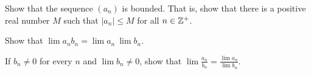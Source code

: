\item Show that the sequence $(a_n)$ is bounded. That is, show that there is a positive real number $M$ such that $|a_n| \leq M$ for all $n \in \mathbb{Z}^+$. 

\item Show that $\lim a_nb_n = \lim a_n \ \lim b_n$. 

\item If $b_n \neq 0$ for every $n$ and $\lim b_n \neq 0$, show that $\lim \frac{a_n}{b_n} = \frac{\lim a_n}{\lim b_n}$. 

\ea

\begin{comment}

\ExerciseSolution

\ba

\item Let $a = \lim a_n$, let $k \in \R$, and let $\epsilon$ be a positive real number. If $k = 0$, then 
\[\lim ka_n = \lim 0 = 0 = 0(a) = 0\lim a_n.\]
So suppose $k \neq 0$. Let $N \in \Z^+$ such that $d(a_n, a) < \frac{\epsilon}{|k|}$ if $n \geq N$. So if $n \geq N$, then 
\[d_E(ka_n, ka) = |k|d_E(a_n,a) < |k| \frac{\epsilon}{|k|} = \epsilon.\]
So $\lim ka_n = ka$. 

\item Let $a = \lim a_n$, $b = \lim b_n$, and let $\epsilon$ be a positive real number. There exists $N_1 \in \Z^+$ such that $d_E(a_n,a) < \frac{\epsilon}{2}$ whenever $n \geq N_1$, and there exists $N_2 \in \Z^+$ such that $d_E(b_n,b) < \frac{\epsilon}{2}$ whenever $n \geq N_2$. Let $N = \max\{N_1, N_2\}$. Then if $n \geq N$ we have 
\begin{align*}
d_E(a_n+b_n, a+b) &= |(a_n+b_n) - (a+b)| \\
	&= |(a_n-a) + (b_n-b)| \\
	&\leq |a_n-a| + |b_n-b| \\
	&< \frac{\epsilon}{2} + \frac{\epsilon}{2} \\
	&= \epsilon.
\end{align*}
Therefore,  $\lim (a_n + b_n) = \lim a_n + \lim b_n$. 

\item Let $a = \lim a_n$. There exists $N \in \Z^+$ such that $d_E(a_n,a) < 1$ whenever $n \geq N$. Thus, if $n \geq N$, we have $|a_n-a| < 1$ or $a-1 < a_n < a+1$. So $|a_n| < K$ for $n \geq N$, where $K = \max\{|a-1|, |a+1|\}$. Let $M = \max\{|a_1|, |a_2|, \ldots, |a_{N-1}|, K\}$. Then $|a_n| \leq M$ for all $n \in \Z^+$. 
 

\end{comment}
